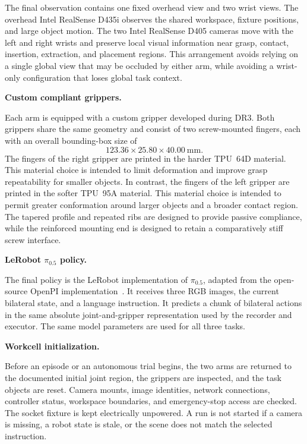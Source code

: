 The final observation contains one fixed overhead view and two wrist views. The overhead Intel RealSense D435i observes the shared workspace, fixture positions, and large object motion. The two Intel RealSense D405 cameras move with the left and right wrists and preserve local visual information near grasp, contact, insertion, extraction, and placement regions. This arrangement avoids relying on a single global view that may be occluded by either arm, while avoiding a wrist-only configuration that loses global task context.

\medskip
\noindent\textbf{Custom compliant grippers.}

Each arm is equipped with a custom gripper developed during DR3. Both grippers share the same geometry and consist of two screw-mounted fingers, each with an overall bounding-box size of
\[
123.36 \times 25.80 \times 40.00~\mathrm{mm}.
\]
The fingers of the right gripper are printed in the harder TPU~64D material. This material choice is intended to limit deformation and improve grasp repeatability for smaller objects. In contrast, the fingers of the left gripper are printed in the softer TPU~95A material. This material choice is intended to permit greater conformation around larger objects and a broader contact region. The tapered profile and repeated ribs are designed to provide passive compliance, while the reinforced mounting end is designed to retain a comparatively stiff screw interface.


\medskip
\noindent\textbf{LeRobot \texorpdfstring{$\pi_{0.5}$}{pi0.5} policy.}

The final policy is the LeRobot implementation of $\pi_{0.5}$, adapted from the open-source OpenPI implementation~\cite{pi05,openpi,lerobot,lerobotpi05}. It receives three RGB images, the current bilateral state, and a language instruction. It predicts a chunk of bilateral actions in the same absolute joint-and-gripper representation used by the recorder and executor. The same model parameters are used for all three tasks.

\medskip
\noindent\textbf{Workcell initialization.}

Before an episode or an autonomous trial begins, the two arms are returned to the documented initial joint region, the grippers are inspected, and the task objects are reset. Camera mounts, image identities, network connections, controller status, workspace boundaries, and emergency-stop access are checked. The socket fixture is kept electrically unpowered. A run is not started if a camera is missing, a robot state is stale, or the scene does not match the selected instruction.

